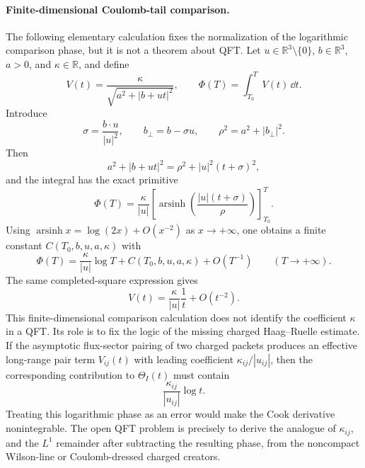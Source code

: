 \paragraph{Finite-dimensional Coulomb-tail comparison.}
The following elementary calculation fixes the normalization of the
logarithmic comparison phase, but it is not a theorem about QFT.  Let
\(u\in\mathbb R^3\setminus\{0\}\), \(b\in\mathbb R^3\), \(a>0\), and
\(\kappa\in\mathbb R\), and define
\[
  V(t)=\frac{\kappa}{\sqrt{a^2+|b+ut|^2}},
  \qquad
  \Phi(T)=\int_{T_0}^{T}V(t)\,\dd t .
\]
Introduce
\[
  \sigma=\frac{b\cdot u}{|u|^2},
  \qquad
  b_\perp=b-\sigma u,
  \qquad
  \rho^2=a^2+|b_\perp|^2 .
\]
Then
\[
  a^2+|b+ut|^2=\rho^2+|u|^2(t+\sigma)^2 ,
\]
and the integral has the exact primitive
\begin{equation}
  \Phi(T)
  =
  \frac{\kappa}{|u|}
  \left[
    \operatorname{arsinh}\!\left(\frac{|u|(t+\sigma)}{\rho}\right)
  \right]_{T_0}^{T}.
  \label{eq:charged-coulomb-tail-asinh-exact}
\end{equation}
Using
\(\operatorname{arsinh} x=\log(2x)+O(x^{-2})\) as \(x\to+\infty\), one obtains
a finite constant \(C(T_0,b,u,a,\kappa)\) with
\begin{equation}
  \Phi(T)=\frac{\kappa}{|u|}\log T+C(T_0,b,u,a,\kappa)+O(T^{-1})
  \qquad (T\to+\infty).
  \label{eq:charged-coulomb-tail-log-phase}
\end{equation}
The same completed-square expression gives
\[
  V(t)=\frac{\kappa}{|u|}\frac1t+O(t^{-2}).
\]
This finite-dimensional comparison calculation does not identify the
coefficient \(\kappa\) in a QFT.  Its role is to fix the logic of the missing
charged Haag--Ruelle estimate.  If the asymptotic
flux-sector pairing of two charged packets produces an effective long-range
pair term \(V_{ij}(t)\) with leading coefficient \(\kappa_{ij}/|u_{ij}|\),
then the corresponding contribution to \(\Theta_I(t)\) must contain
\[
  \frac{\kappa_{ij}}{|u_{ij}|}\log t .
\]
Treating this logarithmic phase as an error would make the Cook derivative
nonintegrable.  The open QFT problem is precisely to derive the analogue of
\(\kappa_{ij}\), and the \(L^1\) remainder after subtracting the resulting
phase, from the noncompact Wilson-line or Coulomb-dressed charged creators.

